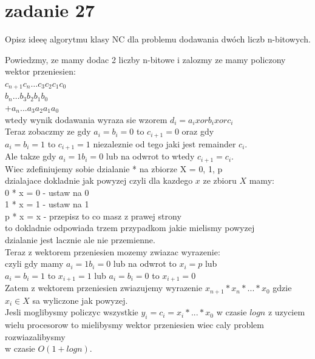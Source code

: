 \section{zadanie 27}
\begin{framed}
Opisz ideeę algorytmu klasy NC dla problemu dodawania dwóch liczb n-bitowych.
\end{framed}

Powiedzmy, ze mamy dodac 2 liczby n-bitowe i zalozmy ze mamy policzony wektor przeniesien:\\
$c_{n+1} c_{n} \ldots c_{3} c_{2} c_{1} c_{0}$\\
 $b_{n} \ldots b_{3} b_{2} b_{1} b_{0}$\\
+$a_{n}...a_{3} a_{2} a_{1} a_{0}$\\
wtedy wynik dodawania wyraza sie wzorem $d_i = a_i xor b_i xor c_i$\\

Teraz zobaczmy ze gdy $a_i = b_i = 0$ to $c_{i+1} = 0$ oraz gdy\\
$a_i = b_i = 1$ to $c_{i+1} = 1$ niezaleznie od tego jaki jest remainder $c_i$.\\
Ale takze gdy $a_i = 1 b_i = 0$ lub na odwrot to wtedy $c_{i+1} = c_i$.\\

Wiec zdefiniujemy sobie dzialanie * na zbiorze X = {0, 1, p}\\
dzialajace dokladnie jak powyzej czyli dla kazdego $x$ ze zbioru $X$ mamy:\\
0 * x = 0 - ustaw na 0\\
1 * x = 1 - ustaw na 1\\
p * x = x - przepisz to co masz z prawej strony\\
to dokladnie odpowiada trzem przypadkom jakie mielismy powyzej\\
dzialanie jest lacznie ale nie przemienne.\\

Teraz z wektorem przeniesien mozemy zwiazac wyrazenie:\\
czyli gdy mamy $a_i = 1 b_i = 0$ lub na odwrot to $x_i = p$ lub\\
$a_i = b_i = 1$ to $x_{i+1} = 1$ lub $a_i = b_i = 0$ to $x_{i+1} = 0$\\

Zatem z wektorem przeniesien zwiazujemy wyrazenie $x_{n+1} * x_n * ... * x_0$ gdzie $x_i \in X$ sa wyliczone jak powyzej.\\
Jesli moglibysmy policzyc wszystkie $y_i = c_i = x_i * ... * x_0$ w czasie $logn$ z uzyciem\\
wielu procesorow to mielibysmy wektor przeniesien wiec caly problem rozwiazalibysmy\\
w czasie $O(1 + logn)$.\\


